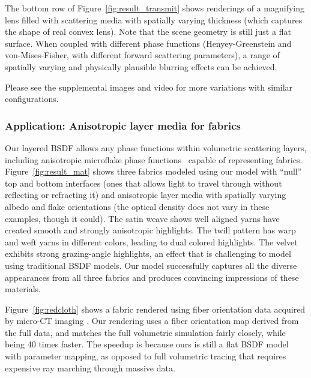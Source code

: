 The bottom row of Figure~\ref{fig:result_transmit} shows renderings of a magnifying lens filled with scattering media with spatially varying thickness (which captures the shape of real convex lens). Note that the scene geometry is still just a flat surface.
When coupled with different phase functions (Henyey-Greenstein and von-Mises-Fisher, with different forward scattering parameters), a range of spatially varying and physically plausible blurring effects can be achieved.

Please see the supplemental images and video for more variations with similar configurations.





\subsubsection{Application: Anisotropic layer media for fabrics}
%
Our layered BSDF allows any phase functions within volumetric scattering layers, including anisotropic microflake phase functions~\cite{Jakob:2010:RTF,Zhao:2011:BVA,Heitz:2015:SMD} capable of representing fabrics.
Figure~\ref{fig:result_mat} shows three fabrics modeled using our model with ``null'' top and bottom interfaces (ones that allows light to travel through without reflecting or refracting it) and anisotropic layer media with spatially varying albedo and flake orientations (the optical density does not vary in these examples, though it could).
The satin weave shows well aligned yarns have created smooth and strongly anisotropic highlights. The twill pattern has warp and weft yarns in different colors, leading to dual colored highlights. The velvet exhibits strong grazing-angle highlights, an effect that is challenging to model using traditional BSDF models. Our model successfully captures all the diverse appearances from all three fabrics and produces convincing impressions of these materials.

Figure~\ref{fig:redcloth} shows a fabric rendered using fiber orientation data acquired by micro-CT imaging \cite{Zhao:2011:BVA}. Our rendering uses a fiber orientation map derived from the full data, and matches the full volumetric simulation fairly closely, while being 40 times faster. The speedup is because ours is still a flat BSDF model with parameter mapping, as opposed to full volumetric tracing that requires expensive ray marching through massive data.

